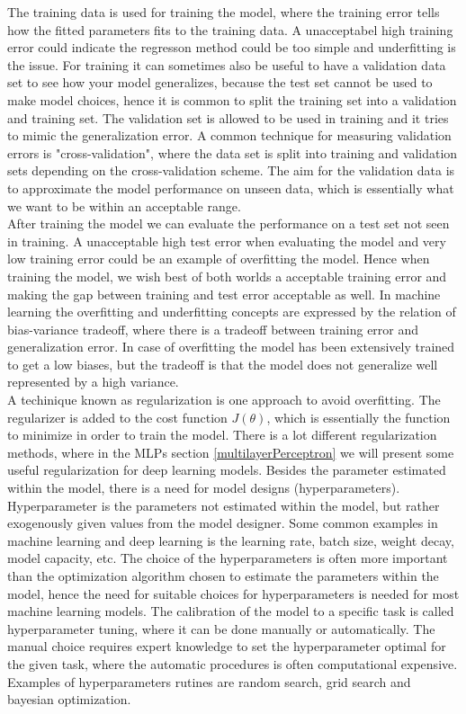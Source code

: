 The training data is used for training the model, where the training error tells how the fitted parameters fits to the training data. A unacceptabel high training error could indicate the regresson method could be too simple and underfitting is the issue. For training it can sometimes also be useful to have a validation data set to see how your model generalizes, because the test set cannot be used to make model choices, hence it is common to split the training set into a validation and training set. The validation set is allowed to be used in training and it tries to mimic the generalization error. A common technique for measuring validation errors is "cross-validation", where the data set is split into training and validation sets depending on the cross-validation scheme. The aim for the validation data is to approximate the model performance on unseen data, which is essentially what we want to be within an acceptable range.\\

After training the model we can evaluate the performance on a test set not seen in training. A unacceptable high test error when evaluating the model and very low training error could be an example of overfitting the model. Hence when training the model, we wish best of both worlds a acceptable training error and making the gap between training and test error acceptable as well. In machine learning the overfitting and underfitting concepts are expressed by the relation of bias-variance tradeoff, where there is a tradeoff between training error and generalization error. In case of overfitting the model has been extensively trained to get a low biases, but the tradeoff is that the model does not generalize well represented by a high variance.\\

A techinique known as regularization is one approach to avoid overfitting. The regularizer is added to the cost function $J(\theta)$, which is essentially the function to minimize in order to train the model. There is a lot different regularization methods, where in the MLPs section \ref{multilayerPerceptron} we will present some useful regularization for deep learning models. Besides the parameter estimated within the model, there is a need for model designs (hyperparameters).\\

Hyperparameter is the parameters not estimated within the model, but rather exogenously given values from the model designer. Some common examples in machine learning and deep learning is the learning rate, batch size, weight decay, model capacity, etc. The choice of the hyperparameters is often more important than the optimization algorithm chosen to estimate the parameters within the model, hence the need for suitable choices for hyperparameters is needed for most machine learning models. The calibration of the model to a specific task is called hyperparameter tuning, where it can be done manually or automatically. The manual choice requires expert knowledge to set the hyperparameter optimal for the given task, where the automatic procedures is often computational expensive. Examples of hyperparameters rutines are random search, grid search and bayesian optimization.\\

